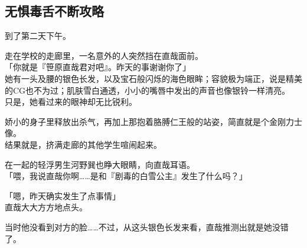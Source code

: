 \subsection{无惧毒舌不断攻略}   %

到了第二天下午。

走在学校的走廊里，一名意外的人突然挡在直哉面前。\\

「你就是『笹原直哉君对吧』。昨天的事谢谢你了」\\

她有一头及腰的银色长发，以及宝石般闪烁的海色眼眸；容貌极为端正，说是精美的CG也不为过；肌肤雪白通透，小小的嘴唇中发出的声音也像银铃一样清亮。\\

只是，她看过来的眼神却无比锐利。

娇小的身子里释放出杀气，再加上那抱着胳膊仁王般的站姿，简直就是个金刚力士像。\\

结果就是，挤满走廊的其他学生喧闹起来。

在一起的轻浮男生河野巽也睁大眼睛，向直哉耳语。\\

「喂，我说直哉你啊……是和『剧毒的白雪公主』发生了什么吗？」 %

「嗯，昨天确实发生了点事情」\\

直哉大大方方地点头。

当时他没看到对方的脸……不过，从这头银色长发来看，直哉推测出就是她没错了。\\

